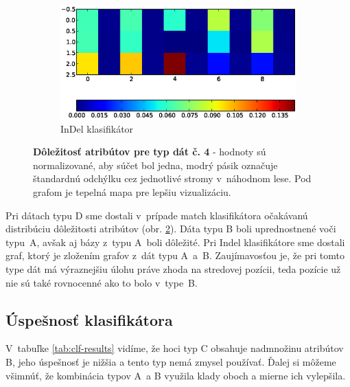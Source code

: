 \begin{figure}[htbp]
\begin{subfigure}[t]{0.4\textwidth}
                \includegraphics[width=\textwidth]{images/clf_fi/randomforest_combined_5_indel_heatmap}
                \caption{InDel klasifikátor}
                \label{fig:datatype4-i}
        \end{subfigure}
        \caption[Dôležitosť atribútov pre typ dát č. 4]{
        \textbf{Dôležitosť atribútov pre typ dát č. 4} - hodnoty sú normalizované, aby súčet bol jedna, modrý pásik označuje štandardnú odchýlku cez jednotlivé stromy v~náhodnom lese.
        Pod grafom je tepelná mapa pre lepšiu vizualizáciu.}
        \label{fig:datatype4}
\end{figure}


Pri dátach typu D sme dostali v~prípade match klasifikátora očakávanú distribúciu dôležitosti atribútov (obr. \ref{fig:datatype4}). Dáta typu B boli uprednostnené voči typu~A, avšak aj bázy z~typu A~boli dôležité. Pri Indel klasifikátore sme dostali graf, ktorý je zložením grafov z~dát typu A~a~B. Zaujímavosťou je, že pri tomto type dát má výraznejšiu úlohu práve zhoda na stredovej pozícii, teda pozície už nie sú také rovnocenné ako to bolo v~type~B.

\FloatBarrier

\subsection{Úspešnosť klasifikátora}

V~tabuľke \ref{tab:clf-results} vidíme, že hoci typ C obsahuje nadmnožinu atribútov B, jeho úspešnosť je nižšia a tento typ nemá zmysel používať. Ďalej si môžeme všimnúť, že kombinácia typov A~a B využila klady oboch a mierne ich vylepšila.

